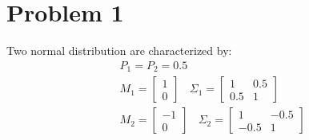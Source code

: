 \documentclass[12pt]{article}
\begin{document}

\tableofcontents
\pagebreak


\section{Problem 1}
Two normal distribution are characterized by: 
\begin{align*}
&P_1 = P_2 = 0.5 \\
&M_1 = \left[ \begin{matrix}
1 \\ 
0 
\end{matrix} 
\right] \> \> \> \>
\Sigma_1 = \left[
\begin{matrix}
1 & 0.5 \\
0.5 & 1
\end{matrix}
\right] \\
&M_2 = \left[ \begin{matrix}
-1 \\ 
0 
\end{matrix} 
\right] \> \> \> \>
\Sigma_2 = \left[
\begin{matrix}
1 & -0.5 \\
-0.5 & 1
\end{matrix}
\right]
\end{align*}
\end{document}
